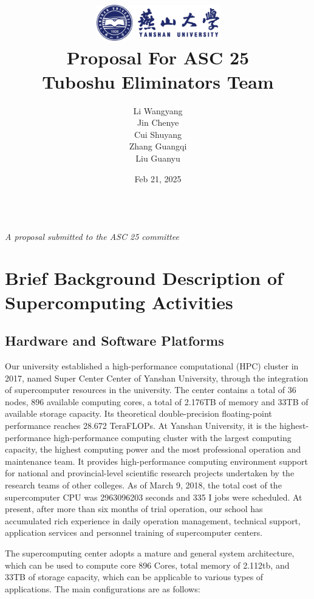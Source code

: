 \documentclass[a4paper,12pt]{article}
\title{
    \includegraphics[width=0.4\textwidth]{ysu-logo.png}\\[2cm] %
    {\LARGE \textbf {Proposal For ASC 25}}\\[0.5cm]
    \large Tuboshu Eliminators Team\\[1cm] %
}
\author{
    \begin{tabular}{c}
        \large Li Wangyang \\[0.15cm]
        \large Jin Chenye \\[0.15cm]
        \large Cui Shuyang \\[0.15cm]
        \large Zhang Guangqi \\[0.15cm]
        \large Liu Guanyu
    \end{tabular}
}
\date{}
\begin{document}
\maketitle
\thispagestyle{empty}
\vfill
\begin{center}
    \date {\large {Feb 21, 2025}} \\[1cm]
    \textit{A proposal submitted to the ASC 25 committee}
\end{center}
\newpage

\tableofcontents
{}
\newpage

\section{Brief Background Description of Supercomputing Activities}

\subsection{Hardware and Software Platforms}

Our university established a high-performance computational (HPC) cluster in 2017, named Super Center Center of Yanshan University, through the integration of supercomputer resources in the university. The center contains a total of 36 nodes, 896 available computing cores, a total of 2.176TB of memory and 33TB of available storage capacity. Its theoretical double-precision floating-point performance reaches 28.672 TeraFLOPs. At Yanshan University, it is the highest-performance high-performance computing cluster with the largest computing capacity, the highest computing power and the most professional operation and maintenance team. It provides high-performance computing environment support for national and provincial-level scientific research projects undertaken by the research teams of other colleges. As of March 9, 2018, the total cost of the supercomputer CPU was 2963096203 seconds and 335 I jobs were scheduled. At present, after more than six months of trial operation, our school has accumulated rich experience in daily operation management, technical support, application services and personnel training of supercomputer centers.

The supercomputing center adopts a mature and general system architecture, which can be used to compute core 896 Cores, total memory of 2.112tb, and 33TB of storage capacity, which can be applicable to various types of applications. The main configurations are as follows:
\end{document}
